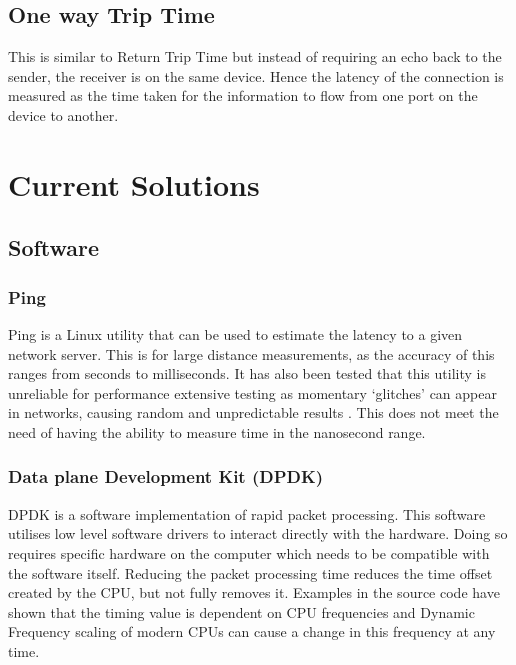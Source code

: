 \subsection{One way Trip Time}

This is similar to Return Trip Time but instead of requiring an echo back to the sender, the receiver is on the
same device. Hence the latency of the connection is measured as the time taken for the information
to flow from one port on the device to another.

\section{Current Solutions}

\subsection{Software}

\subsubsection{Ping}

Ping is a Linux utility that can be used to estimate the latency to a given network server. 
This is for large distance measurements, as the accuracy of this ranges from seconds to milliseconds. 
It has also been tested that this utility is unreliable for performance extensive testing as momentary ‘glitches’ can appear in networks, causing random and unpredictable results \cite{pingisbad}.
This does not meet the need of having the ability to measure time in the nanosecond range.

\subsubsection{Data plane Development Kit (DPDK)}

DPDK is a software implementation of rapid packet processing. 
This software utilises low level software drivers to interact directly with the hardware. 
Doing so requires specific hardware on the computer which needs to be compatible with the software itself.
Reducing the packet processing time reduces the time offset created by the CPU, but not fully removes it. 
Examples in the source code have shown that the timing value is dependent on CPU frequencies \cite{dpdkcode} and Dynamic Frequency scaling \cite{turboboost} of modern CPUs can cause a change in this frequency at any time.

